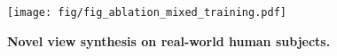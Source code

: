 
\begin{figure}[h]
    \centering
    \texttt{[image: fig/fig\_ablation\_mixed\_training.pdf]}
    \caption{\textbf{Novel view synthesis on real-world human subjects.}}
    \label{fig:ablation_mixed_training}
\end{figure}

